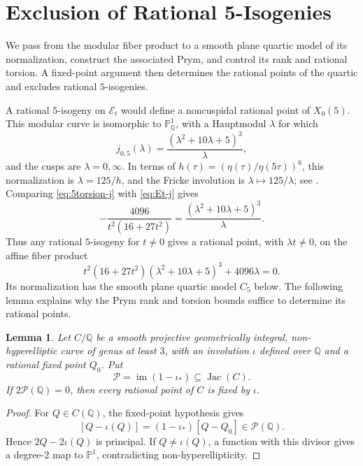 \documentclass[11pt,a4paper]{amsart}
\newtheorem{lemma}[theorem]{Lemma}
\theoremstyle{definition}
\theoremstyle{remark}
\numberwithin{equation}{section}
\newcommand{\Q}{\mathbb{Q}}
\newcommand{\mathcalE}{\mathcal{E}}
\begin{document}
\section{Exclusion of Rational 5-Isogenies}\label{sec:torsion-5}

We pass from the modular fiber product to a smooth plane quartic model
of its normalization, construct the associated Prym, and control its
rank and rational torsion. A fixed-point argument then determines the
rational points of the quartic and excludes rational $5$-isogenies.

A rational \(5\)-isogeny on \(\mathcalE_t\) would define a noncuspidal
rational point of \(X_0(5)\). This modular curve is isomorphic to
\(\mathbb P^1_\Q\), with a Hauptmodul \(\lambda\) for which
\begin{equation}\label{eq:5torsion-j}
j_{0,5}(\lambda)=\frac{(\lambda^2+10\lambda+5)^3}{\lambda},
\end{equation}
and the cusps are \(\lambda=0,\infty\). In terms of
\(h(\tau)=(\eta(\tau)/\eta(5\tau))^6\), this normalization is
\(\lambda=125/h\), and the Fricke involution is
\(\lambda\mapsto125/\lambda\); see
\cite[\S~3.1 and Tables~2 and~7]{maier2009modular}.
Comparing \eqref{eq:5torsion-j} with \eqref{eq:Et-j} gives
\begin{equation}\label{eq:5torsion-eqj}
-\frac{4096}{t^2(16+27t^2)}
=\frac{(\lambda^2+10\lambda+5)^3}{\lambda}.
\end{equation}
Thus any rational \(5\)-isogeny for \(t\neq0\) gives a rational point,
with \(\lambda t\neq0\), on the affine fiber product
\begin{equation}\label{eq:5torsion-affine-fiber}
t^2(16+27t^2)(\lambda^2+10\lambda+5)^3+4096\lambda=0.
\end{equation}
Its normalization has the smooth plane quartic model \(C_5\) below.
The following lemma explains why the Prym rank and torsion bounds
suffice to determine its rational points.

\begin{lemma}\label{lem:prym-fixed-points}
Let \(C/\Q\) be a smooth projective geometrically integral,
non-hyperelliptic curve of genus at least \(3\), with an involution
\(\iota\) defined over \(\Q\) and a rational fixed point \(Q_0\). Put
\[
\mathcal P=\operatorname{im}(1-\iota_*)\subseteq\operatorname{Jac}(C).
\]
If \(2\mathcal P(\Q)=0\), then every rational point of \(C\) is fixed
by \(\iota\).
\end{lemma}

\begin{proof}
For \(Q\in C(\Q)\), the fixed-point hypothesis gives
\[
[Q-\iota(Q)]=(1-\iota_*)[Q-Q_0]\in\mathcal P(\Q).
\]
Hence \(2Q-2\iota(Q)\) is principal. If \(Q\neq\iota(Q)\), a function
with this divisor gives a degree-\(2\) map to \(\mathbb P^1\),
contradicting non-hyperellipticity.
\end{proof}
\end{document}
